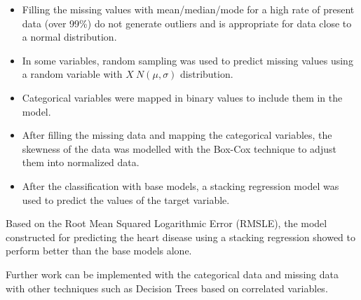 \documentclass[
10pt, %
a4paper, %
oneside, %
headinclude,footinclude, %
BCOR5mm, %
]{scrartcl}
\begin{document}
\begin{itemize}
\item Filling the missing values with mean/median/mode for a high rate of present data (over 99\%) do not generate outliers and is appropriate for data close to a normal distribution.
\item In some variables, random sampling was used to predict missing values using a random variable with $X ~ N(\mu,\sigma)$ distribution.
\item Categorical variables were mapped in binary values to include them in the model.
\item After filling the missing data and mapping the categorical variables, the skewness of the data was modelled with the Box-Cox technique to adjust them into normalized data.
\item After the classification with base models, a stacking regression model was used to predict the values of the target variable.
\end{itemize}

Based on the Root Mean Squared Logarithmic Error (RMSLE), the model constructed for predicting the heart disease using a stacking regression showed to perform better than the base models alone.

Further work can be implemented with the categorical data and missing data with other techniques such as Decision Trees based on correlated variables.


\renewcommand{\refname}{\spacedlowsmallcaps{References}} %




\end{document}

